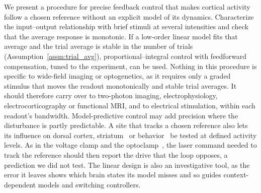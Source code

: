 We present a procedure for precise feedback control that makes cortical activity follow a chosen reference without an explicit model of its dynamics.
Characterize the input--output relationship with brief stimuli at several intensities and check that the average response is monotonic.
If a low-order linear model fits that average and the trial average is stable in the number of trials (Assumption~\ref{assm:trial_avg}), proportional--integral control with feedforward compensation, tuned to the experiment, can be used.
Nothing in this procedure is specific to wide-field imaging or optogenetics, as it requires only a graded stimulus that moves the readout monotonically and stable trial averages.
It should therefore carry over to two-photon imaging, electrophysiology, electrocorticography or functional MRI, and to electrical stimulation, within each readout's bandwidth.
Model-predictive control may add precision where the disturbance is partly predictable.
A site that tracks a chosen reference also lets its influence on dorsal cortex, striatum~\citep{Peters2021} or behavior~\citep{ZatkaHaas2021} be tested at defined activity levels.
As in the voltage clamp and the optoclamp~\citep{newman2015optogenetic}, the laser command needed to track the reference should then report the drive that the loop opposes, a prediction we did not test.
The linear design is also an investigative tool, as the error it leaves shows which brain states its model misses and so guides context-dependent models and switching controllers.
